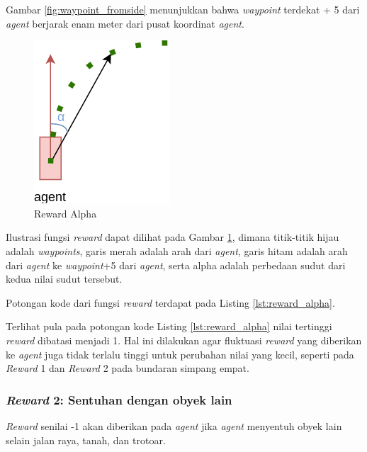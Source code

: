 Gambar \ref{fig:waypoint_fromside} menunjukkan bahwa \textit{waypoint} terdekat + 5 dari \textit{agent} berjarak enam meter dari pusat koordinat \textit{agent}.

\begin{figure}[H] 
	\centering
	\includegraphics[width=.5\linewidth]{images/reward_alpha}
	\caption{Reward Alpha}
	\label{fig:reward_alpha}
\end{figure}

Ilustrasi fungsi \textit{reward} dapat dilihat pada Gambar \ref{fig:reward_alpha}, dimana titik-titik hijau adalah \textit{waypoints}, garis merah adalah arah dari \textit{agent}, garis hitam adalah arah dari \textit{agent} ke \textit{waypoint}+5 dari \textit{agent}, serta alpha adalah perbedaan sudut dari kedua nilai sudut tersebut.

Potongan kode dari fungsi \textit{reward} terdapat pada Listing \ref{lst:reward_alpha}.



Terlihat pula pada potongan kode Listing \ref{lst:reward_alpha} nilai tertinggi \textit{reward} dibatasi menjadi 1. Hal ini dilakukan agar fluktuasi \textit{reward} yang diberikan ke \textit{agent} juga tidak terlalu tinggi untuk perubahan nilai yang kecil, seperti pada \textit{Reward} 1 dan \textit{Reward} 2 pada bundaran simpang empat.

\subsubsection{\textit{Reward} 2: Sentuhan dengan obyek lain}
\textit{Reward} senilai -1 akan diberikan pada \textit{agent} jika \textit{agent} menyentuh obyek lain selain jalan raya, tanah, dan trotoar.


